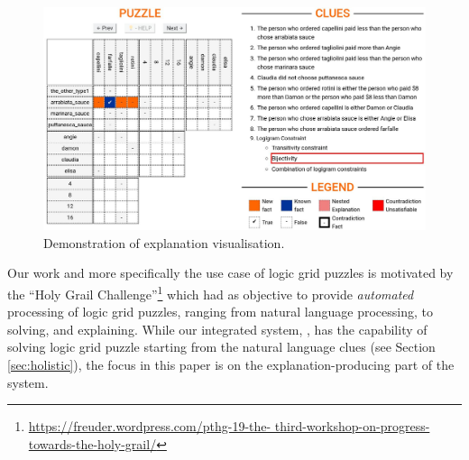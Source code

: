 \begin{figure}[ht]
\centering
\includegraphics[width=0.9\linewidth]{figures/introduction.jpeg}
\caption{Demonstration of explanation visualisation.}
\label{fig:zebrascreen}
\end{figure}

Our work and more specifically the use case of logic grid puzzles is motivated by the ``Holy Grail Challenge''\footnote{\url{https://freuder.wordpress.com/pthg-19-the- third-workshop-on-progress-towards-the-holy-grail/}} which had as objective to provide \textit{automated} processing of logic grid puzzles, ranging from natural language processing, to solving, and explaining.
While our integrated system, \ourtool, has the capability of solving logic grid puzzle starting from the natural language clues (see Section \ref{sec:holistic}), the focus in this paper is on the explanation-producing part of the system.

